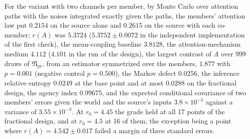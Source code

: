 \begin{numcheck}
For the variant with two channels per member, by Monte Carlo over attention paths with the noises integrated exactly given the paths, the members' attention law put $0.2154$ on the source alone and $0.2615$ on the source with each co-member; $r(A)$ was $5.3724$ ($5.3752\pm0.0072$ in the independent implementation of the first check), the mean-coupling baseline $3.8128$, the attention-mechanism medium $4.112$ ($4.101$ in the run of the design), the largest contrast of $A$ over 999 draws of $\mathfrak N_{\mathrm{pr}}$, from an estimator symmetrized over the members, $1.877$ with $p=0.001$ (negative control $p=0.500$), the Markov defect $0.0256$, the inference relative entropy $0.0249$ at the base point and at most $0.0288$ on the fractional design, the agency index $0.99675$, and the expected conditional covariance of two members' errors given the world and the source's inputs $3.8\times10^{-5}$ against a variance of $3.55\times10^{-3}$. At $r_0=4.45$ the grade held at all 17 points of the fractional design, and at $r_0=4.5$ at 16 of them, the exception being a point where $r(A)=4.542\pm0.017$ failed a margin of three standard errors.


\end{numcheck}
